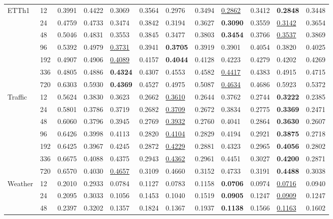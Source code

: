 \begin{table}[ht!]
{\begin{tabular}{ |p{1.7cm}||p{0.15cm}|p{1.05cm}|p{1.05cm}|p{1.05cm}||p{1.05cm}|p{1.05cm}|p{1.05cm}|p{1.1cm}||p{1.05cm}|p{1.15cm}|p{1.05cm}| }
 \hline
 \multirow{7}{*}{ETTh1} & 12&	0.3991&	0.4422&	0.3069&	0.3564&	0.2976&	0.3494&	\underline{0.2862}&	0.3412&	\textbf{0.2848}&	0.3448\\
&24&	0.4759&	0.4733&	0.3474&	0.3842&	0.3194&	0.3627&	\textbf{0.3090}&	0.3559&	\underline{0.3142}&	0.3654\\
&48	&0.5046&	0.4831&	0.3553&	0.3845&	0.3477&	0.3803&	\textbf{0.3454}&	0.3766&	\underline{0.3537}&	0.3869\\
&96	&0.5392&	0.4979&	\underline{0.3731}&	0.3941&	\textbf{0.3705}&	0.3919&	0.3901&	0.4054&	0.3820&	0.4025\\
&192&	0.4907&	0.4906&	\underline{0.4089}	&0.4157&	\textbf{0.4044}&	0.4128&	0.4223&	0.4279&	0.4202&	0.4269\\
&336&	0.4805&	0.4886&	\textbf{0.4324}	&0.4307&	0.4553&	0.4582&	\underline{0.4417}&	0.4383&	0.4915&	0.4715\\
&720&	0.6303&	0.5930	& \textbf{0.4369}&	0.4527&	0.4975&	0.5087&	\underline{0.4634}&	0.4686&	0.5923	&0.5372\\
 \hline
 \multirow{7}{*}{Traffic} & 12&	0.5624&	0.3830&	0.3623&	0.2662&	\underline{0.3610}&	0.2644&	0.3762	&0.2744&	\textbf{0.3222}&	0.2385\\
&24&	0.5801	&0.3786	&0.3719	&0.2682&	\underline{0.3709}&	0.2672&	0.3834&	0.2775&	\textbf{0.3369}&	0.2471\\
& 48	&0.6060	&0.3796	&0.3945&	0.2769&	\underline{0.3932}	&0.2760&	0.4041	&0.2864&	\textbf{0.3630} &	0.2607\\
&96&	0.6426&	0.3998&	0.4113&	0.2820&	\underline{0.4104}&	0.2829&	0.4194&	0.2921&	\textbf{0.3875}&	0.2718\\
&192&	0.6425&	0.3967&	0.4245&	0.2872&	\underline{0.4229}&	0.2881&	0.4323&	0.2965&	\textbf{0.4056}&	0.2802\\
&336&	0.6675&	0.4088	&0.4375&	0.2943&	\underline{0.4362}&	0.2961&	0.4451&	0.3027&	\textbf{0.4200}&	0.2871\\
&720&	0.6570	&0.4030&	\underline{0.4657}&	0.3109&	0.4660&	0.3152&	0.4733&	0.3191&	\textbf{0.4488}&	0.3038
  \\
 \hline
 \multirow{7}{*}{Weather} & 12 & 	0.2010	 & 0.2933 & 	0.0784 & 	0.1127 & 	0.0783 & 	0.1158 & 	\textbf{0.0706} & 	0.0974 & 	\underline{0.0716} & 	0.0940\\
 & 24 & 	0.2095	 & 0.3033 & 	0.1056	 & 0.1453 & 	0.1040	 & 0.1519 & 	\textbf{0.0905} & 	0.1247 & 	\underline{0.0909} & 	0.1247\\
 & 48 & 	0.2397 & 	0.3202 & 	0.1357 & 	0.1824 & 	0.1367	 & 0.1937 & \textbf{0.1138}	 & 0.1566	 & \underline{0.1163} & 	0.1602\\

\end{tabular}}
\end{table}

